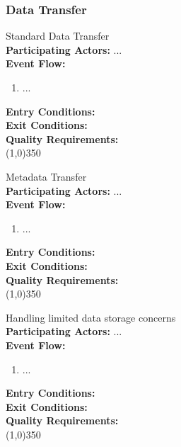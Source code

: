 \subsubsection{Data Transfer}		 
		Standard Data Transfer\\	 
		\textbf{Participating Actors:}  ... \\
		\textbf{Event Flow:}
		\begin{enumerate}
\item  ...
	    \end{enumerate}
		\textbf{Entry Conditions:}\\
		\textbf{Exit Conditions:}\\
		\textbf{Quality Requirements:}\\
		\line(1,0){350}			
			 
		Metadata Transfer\\	 
		\textbf{Participating Actors:}  ... \\
		\textbf{Event Flow:}
		\begin{enumerate}
\item  ...
	    \end{enumerate}
		\textbf{Entry Conditions:}\\
		\textbf{Exit Conditions:}\\
		\textbf{Quality Requirements:}\\
		\line(1,0){350}		
			 
		Handling limited data storage concerns \\	 
		\textbf{Participating Actors:}  ... \\
		\textbf{Event Flow:}
		\begin{enumerate}
\item  ...
	    \end{enumerate}
		\textbf{Entry Conditions:}\\
		\textbf{Exit Conditions:}\\
		\textbf{Quality Requirements:}\\
		\line(1,0){350}	